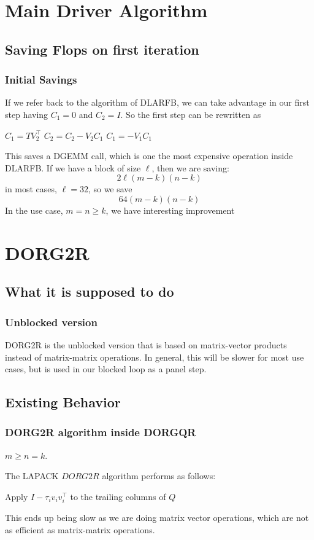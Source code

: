 \documentclass[12pt,aspectratio=169]{beamer}
\begin{document}
    \section{Main Driver Algorithm}
    \subsection{Saving Flops on first iteration}
    \begin{frame}
        \frametitle{Initial Savings}
        If we refer back to the algorithm of DLARFB, we can take advantage in our first step having $C_1 = 0$ and $C_2=I$. So 
        the first step can be rewritten as
        \begin{algorithmic}[1]
            \State $C_1 = TV_2^\top$
            \State $C_2 = C_2 - V_2C_1$
            \State $C_1 =     - V_1C_1$
        \end{algorithmic}
        This saves a DGEMM call, which is one the most expensive operation inside DLARFB. If we have a block of size $\ell$, then we are saving:
        $$
            2\ell\left(m-k\right)\left(n-k\right) 
        $$
        in most cases, $\ell = 32$, so we save
        $$
            64\left(m-k\right)\left(n-k\right)
        $$
        In the use case, $m=n\geq k$, we have interesting improvement
    \end{frame}
    \section{DORG2R}
    \subsection{What it is supposed to do}
    \begin{frame}
        \frametitle{Unblocked version}
        DORG2R is the unblocked version that is based on matrix-vector products instead of matrix-matrix 
        operations. In general, this will be slower for most use cases, but is used in our blocked loop as a panel step.
    \end{frame}
    \subsection{Existing Behavior}
    \begin{frame}
        \frametitle{DORG2R algorithm inside DORGQR}
        $m\geq n=k$.

        The LAPACK $DORG2R$ algorithm performs as follows:
        \begin{algorithmic}[1]
            \State Apply $I-\tau_iv_iv_i^\top$ to the trailing columns of $Q$
            \EndFor
        \end{algorithmic}
        This ends up being slow as we are doing matrix vector operations, which are not as
        efficient as matrix-matrix operations.
    \end{frame}
\end{document}
